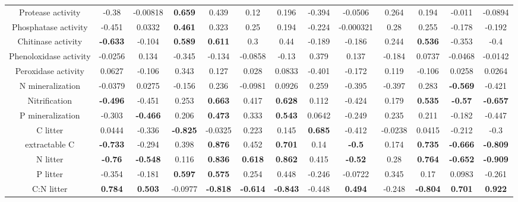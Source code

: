 \documentclass[authoryear,preprint,review,12pt]{elsarticle}
\begin{document}
\begin{landscape}
\begin{table}[h!]
\begin{center}
{\begin{tabular}{ccccccccccccc}
  Protease activity & -0.38 & -0.00818 & \textbf{ 0.659 } & 0.439 & 0.12 & 0.196 & -0.394 & -0.0506 & 0.264 & 0.194 & -0.011 & -0.0894 \\ 
  Phosphatase activity & -0.451 & 0.0332 & \textbf{ 0.461 } & 0.323 & 0.25 & 0.194 & -0.224 & -0.000321 & 0.28 & 0.255 & -0.178 & -0.192 \\ 
  Chitinase activity & \textbf{ -0.633 } & -0.104 & \textbf{ 0.589 } & \textbf{ 0.611 } &  0.3 & 0.44 & -0.189 & -0.186 & 0.244 & \textbf{ 0.536 } & -0.353 & -0.4 \\ 
  Phenoloxidase activity & -0.0256 & 0.134 & -0.345 & -0.134 & -0.0858 & -0.13 & 0.379 & 0.137 & -0.184 & 0.0737 & -0.0468 & -0.0142 \\ 
  Peroxidase activity & 0.0627 & -0.106 & 0.343 & 0.127 & 0.028 & 0.0833 & -0.401 & -0.172 & 0.119 & -0.106 & 0.0258 & 0.0264 \\ 
  N mineralization & -0.0379 & 0.0275 & -0.156 & 0.236 & -0.0981 & 0.0926 & 0.259 & -0.395 & -0.397 & 0.283 & \textbf{ -0.569 } & -0.421 \\ 
  Nitrification & \textbf{ -0.496 } & -0.451 & 0.253 & \textbf{ 0.663 } & 0.417 & \textbf{ 0.628 } & 0.112 & -0.424 & 0.179 & \textbf{ 0.535 } & \textbf{ -0.57 } & \textbf{ -0.657 } \\ 
  P mineralization & -0.303 & \textbf{ -0.466 } & 0.206 & \textbf{ 0.473 } & 0.333 & \textbf{ 0.543 } & 0.0642 & -0.249 & 0.235 & 0.211 & -0.182 & -0.447 \\ 
  C litter & 0.0444 & -0.336 & \textbf{ -0.825 } & -0.0325 & 0.223 & 0.145 & \textbf{ 0.685 } & -0.412 & -0.0238 & 0.0415 & -0.212 & -0.3 \\ 
  extractable C & \textbf{ -0.733 } & -0.294 & 0.398 & \textbf{ 0.876 } & 0.452 & \textbf{ 0.701 } & 0.14 & \textbf{ -0.5 } & 0.174 & \textbf{ 0.735 } & \textbf{ -0.666 } & \textbf{ -0.809 } \\ 
  N litter & \textbf{ -0.76 } & \textbf{ -0.548 } & 0.116 & \textbf{ 0.836 } & \textbf{ 0.618 } & \textbf{ 0.862 } & 0.415 & \textbf{ -0.52 } & 0.28 & \textbf{ 0.764 } & \textbf{ -0.652 } & \textbf{ -0.909 } \\ 
  P litter & -0.354 & -0.181 & \textbf{ 0.597 } & \textbf{ 0.575 } & 0.254 & 0.448 & -0.246 & -0.0722 & 0.345 & 0.17 & 0.0983 & -0.261 \\ 
  C:N litter & \textbf{ 0.784 } & \textbf{ 0.503 } & -0.0977 & \textbf{ -0.818 } & \textbf{ -0.614 } & \textbf{ -0.843 } & -0.448 & \textbf{ 0.494 } & -0.248 & \textbf{ -0.804 } & \textbf{ 0.701 } & \textbf{ 0.922 } \\ 

\end{tabular}}
\end{center}
\end{table}
\end{landscape}
\end{document}
